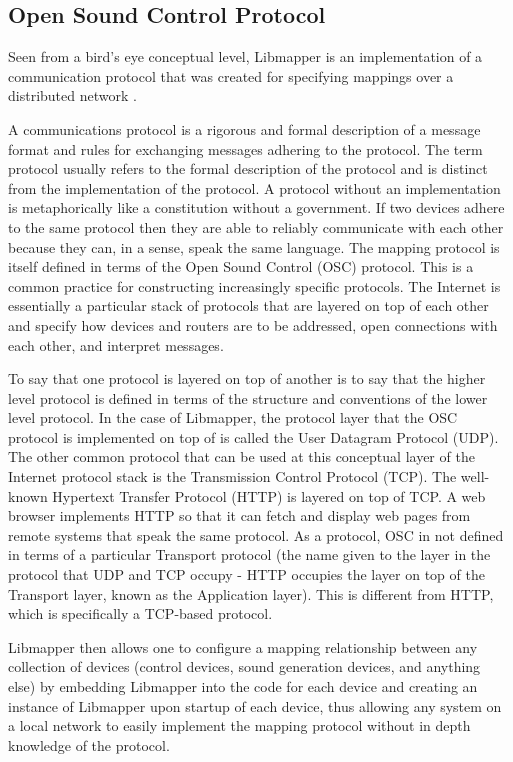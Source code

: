 \subsection{Open Sound Control Protocol}

Seen from a bird's eye conceptual level, Libmapper is an implementation of a communication protocol that was created for specifying mappings over a distributed network \cite{Malloch2009}. 

A communications protocol is a rigorous and formal description of a message format and rules for exchanging messages adhering to the protocol. The term protocol usually refers to the formal description of the protocol and is distinct from the implementation of the protocol. A protocol without an implementation is metaphorically like a constitution without a government. If two devices adhere to the same protocol then they are able to reliably communicate with each other because they can, in a sense, speak the same language. The mapping protocol is itself defined in terms of the Open Sound Control (OSC) protocol. This is a common practice for constructing increasingly specific protocols. The Internet is essentially a particular stack of protocols that are layered on top of each other and specify how devices and routers are to be addressed, open connections with each other, and interpret messages.

To say that one protocol is layered on top of another is to say that the higher level protocol is defined in terms of the structure and conventions of the lower level protocol. In the case of Libmapper, the protocol layer that the OSC protocol is implemented on top of is called the User Datagram Protocol (UDP). The other common protocol that can be used at this conceptual layer of the Internet protocol stack is the Transmission Control Protocol (TCP). The well-known Hypertext Transfer Protocol (HTTP) is layered on top of TCP. A web browser implements HTTP so that it can fetch and display web pages from remote systems that speak the same protocol. As a protocol, OSC in not defined in terms of a particular Transport protocol (the name given to the layer in the protocol that UDP and TCP occupy - HTTP occupies the layer on top of the Transport layer, known as the Application layer). This is different from HTTP, which is specifically a TCP-based protocol.

Libmapper then allows one to configure a mapping relationship between any collection of devices (control devices, sound generation devices, and anything else) by embedding Libmapper into the code for each device and creating an instance of Libmapper upon startup of each device, thus allowing any system on a local network to easily implement the mapping protocol without in depth knowledge of the protocol.

